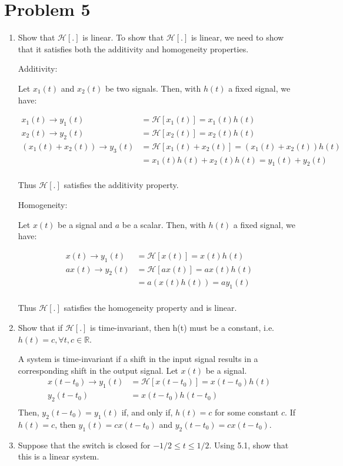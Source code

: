 \documentclass{article}
\begin{document}
\section{Problem 5}
\begin{enumerate}[label=5.\arabic*]
    \item Show that $\mathcal{H}[.]$ is linear.
    To show that $\mathcal{H}[.]$ is linear, we need to show that it satisfies both the additivity and homogeneity properties.

    Additivity:

    Let $x_1(t)$ and $x_2(t)$ be two signals. Then, with $h(t)$ a fixed signal, we have:

    \begin{align*}
        x_1(t) \rightarrow y_1(t) &= \mathcal{H}[x_1(t)] = x_1(t) h(t) \\
        x_2(t) \rightarrow y_2(t) &= \mathcal{H}[x_2(t)] = x_2(t) h(t) \\
        (x_1(t) + x_2(t)) \rightarrow y_3(t) &= \mathcal{H}[x_1(t) + x_2(t)] = (x_1(t) + x_2(t)) h(t) \\
        &= x_1(t)h(t) + x_2(t)h(t) = y_1(t) + y_2(t) \\
    \end{align*}

    Thus $\mathcal{H}[.]$ satisfies the additivity property.

    Homogeneity:

    Let $x(t)$ be a signal and $a$ be a scalar. Then, with $h(t)$ a fixed signal, we have:

    \begin{align*}
        x(t) \rightarrow y_1(t) &= \mathcal{H}[x(t)] = x(t) h(t) \\
        ax(t) \rightarrow y_2(t) &= \mathcal{H}[ax(t)] = ax(t) h(t) \\
        &= a(x(t)h(t)) = ay_1(t) \\
    \end{align*}

    Thus $\mathcal{H}[.]$ satisfies the homogeneity property and is linear.

    \item Show that if $\mathcal{H}[.]$ is time-invariant, then h(t) must be a constant, i.e. $h(t) = c, \forall t, c \in \mathbb{R}$.
    
    A system is time-invariant if a shift in the input signal results in a corresponding shift in the output signal. Let $x(t)$ be a signal.
    \begin{align*}
        x(t-t_0) \rightarrow y_1(t) &= \mathcal{H}[x(t-t_0)] = x(t-t_0) h(t) \\
        y_2(t-t_0) &= x(t-t_0) h(t-t_0) \\
    \end{align*}
    Then, $y_2(t-t_0) = y_1(t)$ if, and only if, $h(t) = c$ for some constant $c$. If $h(t) = c$, then $y_1(t) = cx(t-t_0)$ and $y_2(t-t_0) = cx(t-t_0)$. 
    \item Suppose that the switch is closed for $-1/2 \leq t \leq 1/2$. Using 5.1, show that this is a linear system.


\end{enumerate}
\end{document}
